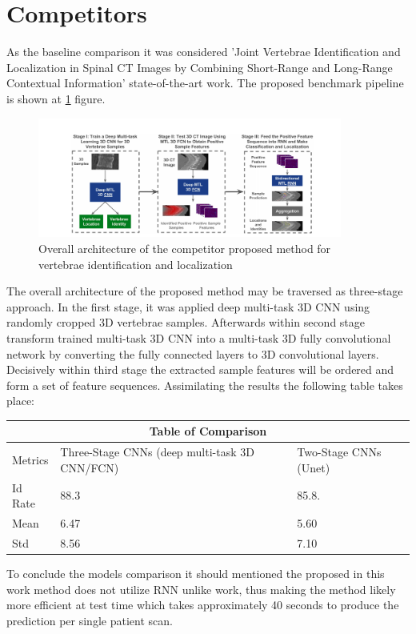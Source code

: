 \section{Competitors}
As the baseline comparison it was considered \cite{Liao2018} 'Joint Vertebrae Identification and Localization in Spinal CT Images by Combining Short-Range and Long-Range Contextual Information' state-of-the-art work. The proposed benchmark pipeline is shown at \ref{fig:competitor} figure.

\begin{figure}[h]
    \centering \includegraphics[width=10cm]{images/competitor.png}
    \caption {Overall architecture of the competitor proposed method for vertebrae identification and localization}
    \label{fig:competitor}
\end{figure}

The overall architecture of the proposed method may be traversed as three-stage approach. In the first stage, it was applied deep multi-task 3D CNN using randomly cropped 3D vertebrae samples. Afterwards within second stage transform trained multi-task 3D CNN into a multi-task 3D fully convolutional network by converting the fully connected layers to 3D convolutional layers. Decisively within third stage the extracted sample features will be ordered and form a set of feature sequences. Assimilating the results the following table takes place:

\begin{tabular}{|p{2cm}||p{7cm}|p{5cm}|}
 \hline
 \multicolumn{3}{|c|}{Table of Comparison} \\
 \hline
 Metrics & Three-Stage CNNs (deep multi-task 3D CNN/FCN) & Two-Stage CNNs (Unet) \\
 \hline
 Id Rate   & 88.3 & 85.8.    \\
 Mean      & 6.47  & 5.60    \\
 Std       & 8.56  & 7.10    \\
 \hline
\end{tabular}


To conclude the models comparison it should mentioned the proposed in this work method does not utilize RNN unlike \cite{Liao2018} work, thus making the method likely more efficient at test time which takes approximately 40 seconds to produce the prediction per single patient scan. 